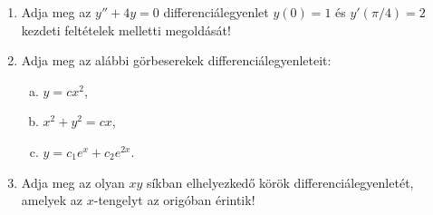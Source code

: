 \documentclass{szb-practice}
\begin{document}
\begin{enumerate}
  \item Adja meg az $y'' + 4y = 0$ differenciálegyenlet $y(0) = 1$ és
        $y'(\pi/4) = 2$ kezdeti feltételek melletti megoldását!

  \item Adja meg az alábbi görbeserekek differenciálegyenleteit:
        \begin{enumerate}[a)]
          \item $y = c x^2$,
          \item $x^2 + y^2 = cx$,
          \item $y = c_1 e^x + c_2 e^{2x}$.
        \end{enumerate}

  \item Adja meg az olyan $xy$ síkban elhelyezkedő körök differenciálegyenletét,
        amelyek az $x$-tengelyt az origóban érintik!







\end{enumerate}
\end{document}
